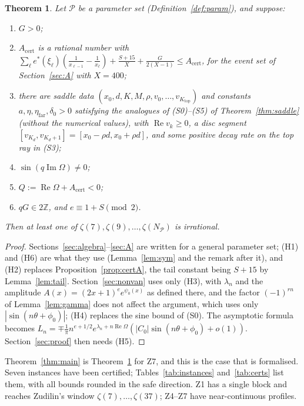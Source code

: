 \documentclass[11pt]{amsart}
\newtheorem{theorem}{Theorem}[section]
\theoremstyle{definition}
\theoremstyle{remark}
\numberwithin{equation}{section}
\newcommand{\ZZ}{\mathbb{Z}}
\newcommand{\cP}{\mathcal{P}}
\newcommand{\Acert}{A_{\mathrm{cert}}}
\newcommand{\etafar}{\eta_{\mathrm{far}}}
\renewcommand{\Re}{\operatorname{Re}}
\renewcommand{\Im}{\operatorname{Im}}
\begin{document}
\begin{theorem}\label{thm:general}
Let $\cP$ be a parameter set (Definition~\ref{def:param}), and suppose:
\begin{enumerate}
\item[(H1)] $G>0$;
\item[(H2)] $\Acert$ is a rational number with
  $\sum_{\ell}e^*(\xi_\ell)(\frac1{x_{\ell-1}}-\frac1{x_\ell})+\frac{S+15}{X}+\frac{G}{2(X-1)}\le\Acert$, for the event
  set of Section~\ref{sec:A} with $X=400$;
\item[(H3)] there are saddle data $(x_0,d,K,M,\rho,v_0,\dots,v_{K_{\mathrm{top}}})$ and constants
  $a,\eta,\etafar,\delta_0>0$ satisfying the analogues of (S0)--(S5) of Theorem~\ref{thm:saddle} (without the
  numerical values), with $\Re v_k\ge0$, a disc segment $[v_{K_d},v_{K_d+1}]=[x_0-\rho d,x_0+\rho d]$, and some
  positive decay rate on the top ray in (S3);
\item[(H4)] $\sin(q\Im\Omega)\ne0$;
\item[(H5)] $Q:=\Re\Omega+\Acert<0$;
\item[(H6)] $qG\in2\ZZ$, and $e\equiv1+S\pmod2$.
\end{enumerate}
Then at least one of $\zeta(7),\zeta(9),\dots,\zeta(N_\cP)$ is irrational.
\end{theorem}

\begin{proof}
Sections~\ref{sec:algebra}--\ref{sec:A} are written for a general parameter set; (H1) and (H6) are what they use
(Lemma~\ref{lem:sym} and the remark after it), and (H2) replaces Proposition~\ref{prop:certA}, the tail constant
being $S+15$ by Lemma~\ref{lem:tail}. Section~\ref{sec:nonvan} uses only (H3), with $\lambda_n$ and the amplitude
$A(x)=(2x+1)^ee^{\psi_0(x)}$ as defined there, and the factor $(-1)^{rn}$ of Lemma~\ref{lem:gamma} does not affect
the argument, which uses only $|\sin(n\theta+\phi_0)|$; (H4) replaces the sine bound of (S0). The asymptotic
formula becomes $L_n=\mp\frac1\pi n^{e+1/2}e^{\lambda_n+n\Re\Omega}(|C_0|\sin(n\theta+\phi_0)+o(1))$. Section~\ref{sec:proof}
then needs (H5).
\end{proof}

Theorem~\ref{thm:main} is Theorem~\ref{thm:general} for Z7, and this is the case that is formalised. Seven
instances have been certified; Tables~\ref{tab:instances} and~\ref{tab:certs} list them, with all bounds rounded in
the safe direction. Z1 has a single block and reaches Zudilin's window $\zeta(7),\dots,\zeta(37)$; Z4--Z7 have
near-continuous profiles.
\end{document}
